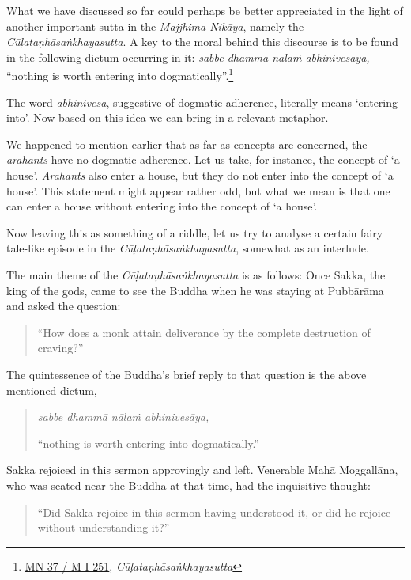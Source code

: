 What we have discussed so far could perhaps be better appreciated in the light of another important sutta in the \emph{Majjhima Nikāya}, namely the \emph{Cūḷataṇhāsaṅkhayasutta}. A key to the moral behind this discourse is to be found in the following dictum occurring in it: \emph{sabbe dhammā nālaṁ abhinivesāya,} ``nothing is worth entering into dogmatically''.\footnote{\href{https://suttacentral.net/mn37/pli/ms}{MN 37 / M I 251}, \emph{Cūḷataṇhāsaṅkhayasutta}}

The word \emph{abhinivesa}, suggestive of dogmatic adherence, literally means `entering into'. Now based on this idea we can bring in a relevant metaphor.

We happened to mention earlier that as far as concepts are concerned, the \emph{arahants} have no dogmatic adherence. Let us take, for instance, the concept of `a house'. \emph{Arahants} also enter a house, but they do not enter into the concept of `a house'. This statement might appear rather odd, but what we mean is that one can enter a house without entering into the concept of `a house'.

Now leaving this as something of a riddle, let us try to analyse a certain fairy tale-like episode in the \emph{Cūḷataṇhāsaṅkhayasutta}, somewhat as an interlude.

The main theme of the \emph{Cūḷataṇhāsaṅkhayasutta} is as follows: Once Sakka, the king of the gods, came to see the Buddha when he was staying at Pubbārāma and asked the question:

\begin{quote}
``How does a monk attain deliverance by the complete destruction of craving?''
\end{quote}

The quintessence of the Buddha's brief reply to that question is the above mentioned dictum,

\begin{quote}
\emph{sabbe dhammā nālaṁ abhinivesāya,}

``nothing is worth entering into dogmatically.''
\end{quote}

Sakka rejoiced in this sermon approvingly and left. Venerable Mahā Moggallāna, who was seated near the Buddha at that time, had the inquisitive thought:

\begin{quote}
``Did Sakka rejoice in this sermon having understood it, or did he rejoice without understanding it?''
\end{quote}


